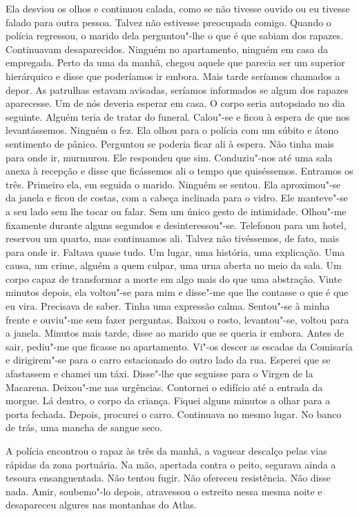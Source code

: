 Ela desviou os olhos e continuou calada, como se não tivesse ouvido ou
eu tivesse falado para outra pessoa. Talvez não estivesse preocupada
comigo. Quando o polícia regressou, o marido dela perguntou"-lhe o que é
que sabiam dos rapazes. Continuavam desaparecidos. Ninguém no
apartamento, ninguém em casa da empregada. Perto da uma da manhã, chegou
aquele que parecia ser um superior hierárquico e disse que poderíamos ir
embora. Mais tarde seríamos chamados a depor. As patrulhas estavam
avisadas, seríamos informados se algum dos rapazes aparecesse. Um de nós
deveria esperar em casa. O corpo seria autopsiado no dia seguinte.
Alguém teria de tratar do funeral. Calou"-se e ficou à espera de que nos
levantássemos. Ninguém o fez. Ela olhou para o polícia com um súbito e
átono sentimento de pânico. Perguntou se poderia ficar ali à espera. Não
tinha mais para onde ir, murmurou. Ele respondeu que sim. Conduziu"-nos
até uma sala anexa à recepção e disse que ficássemos ali o tempo que
quiséssemos. Entramos os três. Primeiro ela, em seguida o marido.
Ninguém se sentou. Ela aproximou"-se da janela e ficou de costas, com a
cabeça inclinada para o vidro. Ele manteve"-se a seu lado sem lhe tocar
ou falar. Sem um único gesto de intimidade. Olhou"-me fixamente durante
alguns segundos e desinteressou"-se. Telefonou para um hotel, reservou
um quarto, mas continuamos ali. Talvez não tivéssemos, de fato, mais
para onde ir. Faltava quase tudo. Um lugar, uma história, uma
explicação. Uma causa, um crime, alguém a quem culpar, uma urna aberta
no meio da sala. Um corpo capaz de transformar a morte em algo mais do
que uma abstração. Vinte minutos depois, ela voltou"-se para mim e
disse"-me que lhe contasse o que é que eu vira. Precisava de saber.
Tinha uma expressão calma. Sentou"-se à minha frente e ouviu"-me sem
fazer perguntas. Baixou o rosto, levantou"-se, voltou para a janela.
Minutos mais tarde, disse ao marido que se queria ir embora. Antes de
sair, pediu"-me que ficasse no apartamento. Vi"-os descer as escadas da
Comisaría e dirigirem"-se para o carro estacionado do outro lado da rua.
Esperei que se afastassem e chamei um táxi. Disse"-lhe que seguisse para
o Virgen de la Macarena. Deixou"-me nas urgências. Contornei o edifício
até a entrada da morgue. Lá dentro, o corpo da criança. Fiquei alguns
minutos a olhar para a porta fechada. Depois, procurei o carro.
Continuava no mesmo lugar. No banco de trás, uma mancha de sangue seco.

A polícia encontrou o rapaz às três da manhã, a vaguear descalço pelas
vias rápidas da zona portuária. Na mão, apertada contra o peito,
segurava ainda a tesoura ensanguentada. Não tentou fugir. Não ofereceu
resistência. Não disse nada. Amir, soubemo"-lo depois, atravessou o\enlargethispage{\textheight}
estreito nessa mesma noite e desapareceu algures nas montanhas do Atlas.

